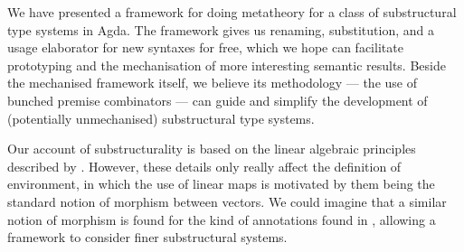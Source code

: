 We have presented a framework for doing metatheory for a class of substructural
type systems in Agda.
The framework gives us renaming, substitution, and a usage elaborator for new
syntaxes for free, which we hope can facilitate prototyping and the
mechanisation of more interesting semantic results.
Beside the mechanised framework itself, we believe its methodology --- the use
of bunched premise combinators --- can guide and simplify the development of
(potentially unmechanised) substructural type systems.

Our account of substructurality is based on the linear algebraic
principles described by \citet{WA20}.
However, these details only really affect the definition of environment,
in which the use of linear maps is motivated by them being the standard notion
of morphism between vectors.
We could imagine that a similar notion of morphism is found for the kind of
annotations found in \citet{LicataSR17}, allowing a framework to consider
finer substructural systems.
